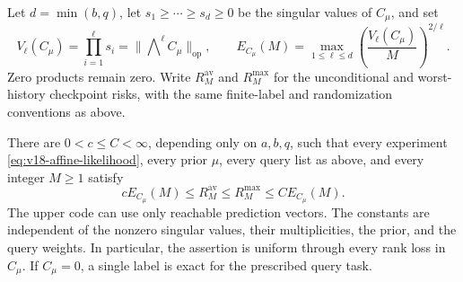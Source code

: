 Let $d=\min(b,q)$, let $s_1\ge\cdots\ge s_d\ge0$ be the singular
values of $C_\mu$, and set
\begin{equation}\label{eq:v18-affine-profile}
 V_\ell(C_\mu)=\prod_{i=1}^\ell s_i
             =\|\mathop{\bigwedge}\nolimits^\ell C_\mu\|_{\mathrm{op}},
 \qquad
 E_{C_\mu}(M)=\max_{1\le\ell\le d}
           \left(\frac{V_\ell(C_\mu)}{M}\right)^{2/\ell}.
\end{equation}
Zero products remain zero. Write $R^{\mathrm{av}}_M$ and
$R^{\mathrm{max}}_M$ for the unconditional and worst-history checkpoint
risks, with the same finite-label and randomization conventions as above.

\begin{theorem}
\label{thm:v18-affine-classification}
There are $0<c\le C<\infty$, depending only on $a,b,q$, such that every
experiment \eqref{eq:v18-affine-likelihood}, every prior $\mu$, every
query list as above, and every integer $M\ge1$ satisfy
\begin{equation}\label{eq:v18-affine-law}
 cE_{C_\mu}(M)\le R^{\mathrm{av}}_M
 \le R^{\mathrm{max}}_M\le CE_{C_\mu}(M).
\end{equation}
The upper code can use only reachable prediction vectors. The constants
are independent of the nonzero singular values, their multiplicities,
the prior, and the query weights. In particular, the assertion is
uniform through every rank loss in $C_\mu$. If $C_\mu=0$, a single
label is exact for the prescribed query task.
\end{theorem}

